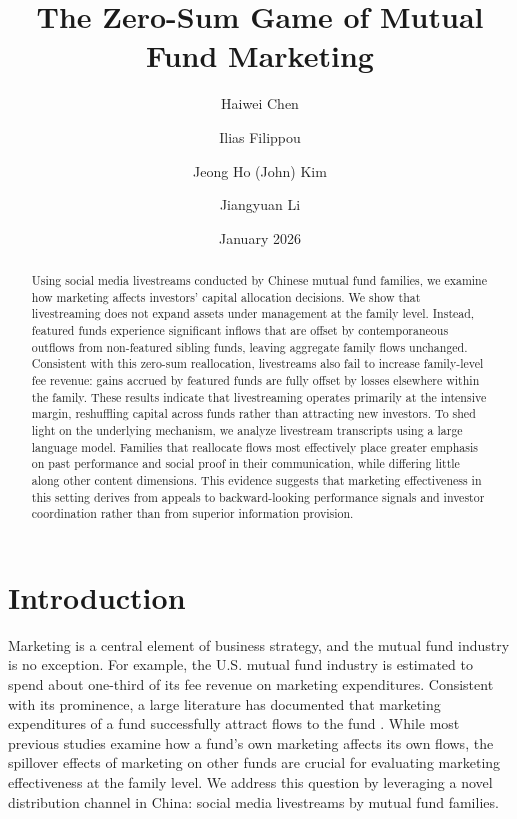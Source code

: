 \documentclass[12pt]{article}
\title{The Zero-Sum Game of Mutual Fund Marketing}
\author[1]{Haiwei Chen}
\author[2]{Ilias Filippou}
\author[2]{Jeong Ho (John) Kim}
\author[1]{Jiangyuan Li}
\affil[1]{Shanghai University of Finance and Economics}
\affil[2]{Florida State University}
\date{January 2026}
\begin{document}
\maketitle
\thispagestyle{empty}

\begin{abstract}
    Using social media livestreams conducted by Chinese mutual fund families, we examine how marketing affects investors’ capital allocation decisions. We show that livestreaming does not expand assets under management at the family level. Instead, featured funds experience significant inflows that are offset by contemporaneous outflows from non-featured sibling funds, leaving aggregate family flows unchanged. Consistent with this zero-sum reallocation, livestreams also fail to increase family-level fee revenue: gains accrued by featured funds are fully offset by losses elsewhere within the family. These results indicate that livestreaming operates primarily at the intensive margin, reshuffling capital across funds rather than attracting new investors. To shed light on the underlying mechanism, we analyze livestream transcripts using a large language model. Families that reallocate flows most effectively place greater emphasis on past performance and social proof in their communication, while differing little along other content dimensions. This evidence suggests that marketing effectiveness in this setting derives from appeals to backward-looking performance signals and investor coordination rather than from superior information provision.
    
\end{abstract}


\doublespacing%

\clearpage
\setcounter{page}{1}

\section{Introduction}

Marketing is a central element of business strategy, and the mutual fund industry is no exception. For example, the U.S. mutual fund industry is estimated to spend about one-third of its fee revenue on marketing expenditures. Consistent with its prominence, a large literature has documented that marketing expenditures of a fund successfully attract flows to the fund \citep{sirri1998costly,huang2007participation,gallaher2008advertising,christofferson2013what,roussanov2021marketing}. While most previous studies examine how a fund's own marketing affects its own flows, the spillover effects of marketing on other funds are crucial for evaluating marketing effectiveness at the family level. We address this question by leveraging a novel distribution channel in China: social media livestreams by mutual fund families.
\end{document}
